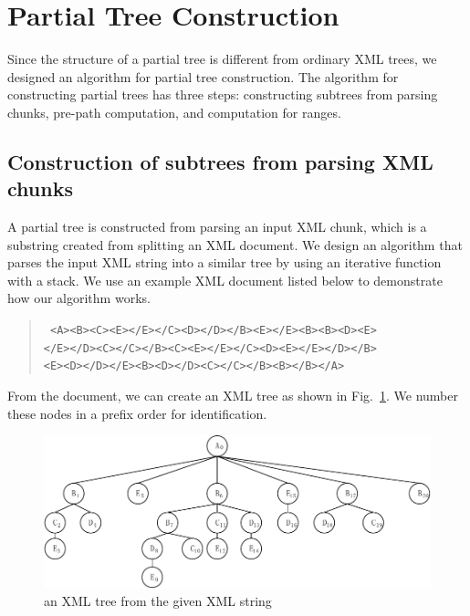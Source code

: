 \def\INDEXSET#1{\mathit{#1}_{[P]}}
\def\baselinestretch{1.5}

\section{Partial Tree Construction}
\label{sec:construction}

Since the structure of a partial tree is different from ordinary XML trees, 
we designed an algorithm for partial tree construction.
The algorithm for constructing partial trees has three steps: constructing subtrees from parsing chunks, pre-path computation, and computation for ranges. 

\subsection{Construction of subtrees from parsing XML chunks}

A partial tree is constructed from parsing an input XML chunk, which is  
a substring created from splitting an XML document. We design an algorithm that parses 
the input XML string into a similar tree by using an iterative function with 
a stack. We use an example XML document listed below to demonstrate how our algorithm works.

\begin{quote}\tt\small
<A><B><C><E></E></C><D></D></B><E></E><B><B><D><E>\\
</E></D><C></C></B><C><E></E></C><D><E></E></D></B>\\
<E><D></D></E><B><D></D><C></C></B><B></B></A>\\
\end{quote}
 
From the document, we can create an XML tree as shown in Fig.~\ref{fig:tree}.
We number these nodes in a prefix order for identification.

\begin{figure}[t]
	\centering\includegraphics[]{partialtree/figures/fromWord-5.pdf}
	\caption{an XML tree from the given XML string}
	\label{fig:tree}
\end{figure}

